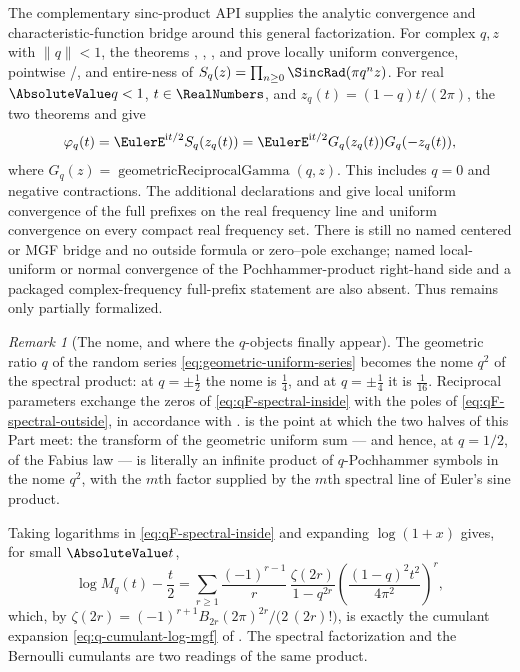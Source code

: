 \documentclass[11pt,a4paper,oneside,openany]{book}
\theoremstyle{definition}
\theoremstyle{remark}
\newtheorem{remark}[remark]{Remark}
\begin{document}
The complementary sinc-product API supplies the analytic convergence and
characteristic-function bridge around this general factorization.  For
complex $q,z$ with $\lVert q\rVert<1$, the theorems
,
,
, and
 prove locally uniform convergence,
pointwise /, and entire-ness of
$S_q(z)=\prod_{n\ge0}\SincRad(\pi q^nz)$.  For real
$\AbsoluteValue q<1$, $t\in\RealNumbers$, and $z_q(t)=(1-q)t/(2\pi)$, the two theorems
and
give
\[
 \varphi_q(t)=\EulerE^{\mathrm i t/2}S_q(z_q(t))
 =\EulerE^{\mathrm i t/2}G_q(z_q(t))G_q(-z_q(t)),
\]
where $G_q(z)=\operatorname{geometricReciprocalGamma}(q,z)$.  This includes
$q=0$ and negative contractions.  The additional declarations
 and
 give local uniform convergence
of the full prefixes on the real frequency line and uniform convergence on
every compact real frequency set.  There is still no named centered
or MGF bridge and no outside formula or zero--pole exchange; named
local-uniform or normal convergence of the Pochhammer-product right-hand
side and a packaged complex-frequency full-prefix statement are also
absent.  Thus  remains only partially formalized.

\begin{remark}[The nome, and where the $q$-objects finally appear]\label{rem:qF-nome}
The geometric ratio $q$ of the random series \eqref{eq:geometric-uniform-series}
becomes the nome $q^2$ of the spectral product: at $q=\pm\tfrac12$ the nome is
$\tfrac14$, and at $q=\pm\tfrac14$ it is $\tfrac1{16}$.  Reciprocal parameters
exchange the zeros of \eqref{eq:qF-spectral-inside} with the poles of
\eqref{eq:qF-spectral-outside}, in accordance with .
 is the point at which the two halves of this Part meet:
the transform of the geometric uniform sum --- and hence, at $q=1/2$, of the
Fabius law --- is literally an infinite product of $q$-Pochhammer symbols in the
nome $q^2$, with the $m$th factor supplied by the $m$th spectral line of Euler's
sine product.

Taking logarithms in \eqref{eq:qF-spectral-inside} and expanding $\log(1+x)$
gives, for small $\AbsoluteValue t$,
\[
 \log M_q(t)-\frac t2
 =\sum_{r\ge1}\frac{(-1)^{r-1}}{r}\,
   \frac{\zeta(2r)}{1-q^{2r}}\left(\frac{(1-q)^2t^2}{4\pi^2}\right)^{\!r},
\]
which, by $\zeta(2r)=(-1)^{r+1}B_{2r}(2\pi)^{2r}/\bigl(2\,(2r)!\bigr)$, is
exactly the cumulant expansion \eqref{eq:q-cumulant-log-mgf} of
.  The spectral factorization and the Bernoulli
cumulants are two readings of the same product.
\end{remark}
\end{document}
